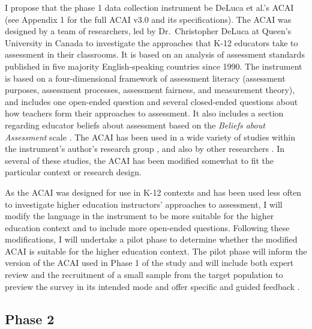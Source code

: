 \documentclass[
]{book}
\begin{document}
I propose that the phase 1 data collection instrument be DeLuca et al.'s \citeyearpar{delucaApproachesClassroomAssessment2016} ACAI (see Appendix 1 for the full ACAI v3.0 and its specifications). The ACAI was designed by a team of researchers, led by Dr.~Christopher DeLuca at Queen's University in Canada to investigate the approaches that K-12 educators take to assessment in their classrooms. It is based on an analysis of assessment standards published in five majority English-speaking countries since 1990. The instrument is based on a four-dimensional framework of assessment literacy (assessment purposes, assessment processes, assessment fairness, and measurement theory), and includes one open-ended question and several closed-ended questions about how teachers form their approaches to assessment. It also includes a section regarding educator beliefs about assessment based on the \emph{Beliefs about Assessment} scale \citep{smithPreparingTeachersUse2014}. The ACAI has been used in a wide variety of studies within the instrument's author's research group \citep{coombsChangingApproachesClassroom2018, coombsPersoncenteredAnalysisTeacher2020, delucaDifferentialSituatedView2019, delucaTeachersApproachesClassroom2016, delucaPoliciesProgramsPractices2019, schneiderLinkingPersonalityTeachers2020}, and also by other researchers \citep{nayaginPreserviceTeachersApproaches2020}. In several of these studies, the ACAI has been modified somewhat to fit the particular context or research design.

As the ACAI was designed for use in K-12 contexts and has been used less often to investigate higher education instructors' approaches to assessment, I will modify the language in the instrument to be more suitable for the higher education context and to include more open-ended questions. Following these modifications, I will undertake a pilot phase to determine whether the modified ACAI is suitable for the higher education context. The pilot phase will inform the version of the ACAI used in Phase 1 of the study and will include both expert review and the recruitment of a small sample from the target population to preview the survey in its intended mode and offer specific and guided feedback \citep{hibbertsCommonSurveySampling2012, rencklyAirUniversitySampling2002}.

\hypertarget{phase-2}{%
\subsection{Phase 2}\label{phase-2}}
\end{document}
